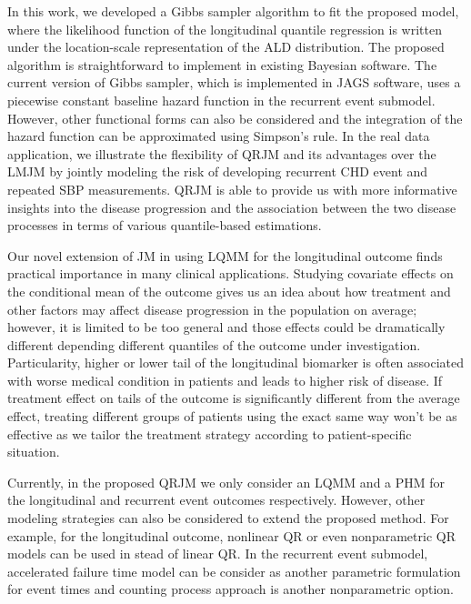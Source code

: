 In this work, we developed a Gibbs sampler algorithm to fit the proposed model, where the likelihood function of the longitudinal quantile regression is written under the location-scale representation of the ALD distribution. The proposed algorithm is straightforward to implement in existing Bayesian software. The current version of Gibbs sampler, which is implemented in \textsf{JAGS} software, uses a piecewise constant baseline hazard function in the recurrent event submodel. However, other functional forms can also be considered and the integration of the hazard function can be approximated using Simpson's rule. In the real data application, we illustrate the flexibility of QRJM and its advantages over the LMJM by jointly modeling the risk of developing recurrent CHD event and repeated SBP measurements. QRJM is able to provide us with more informative insights into the disease progression and the association between the two disease processes in terms of various quantile-based estimations.

Our novel extension of JM in using LQMM for the longitudinal outcome finds practical importance in many clinical applications. Studying covariate effects on the conditional mean of the outcome gives us an idea about how treatment and other factors may affect disease progression in the population on average; however, it is limited to be too general and those effects could be dramatically different depending different quantiles of the outcome under investigation. Particularity, higher or lower tail of the longitudinal biomarker is often associated with worse medical condition in patients and leads to higher risk of disease. If treatment effect on tails of the outcome is significantly different from the average effect, treating different groups of patients using the exact same way won't be as effective as we tailor the treatment strategy according to patient-specific situation.


Currently, in the proposed QRJM we only consider an LQMM and a PHM for the longitudinal and recurrent event outcomes respectively. However, other modeling strategies can also be considered to extend the proposed method. For example, for the longitudinal outcome, nonlinear QR \citep{koenker1996interior} or even nonparametric QR \citep{le2005nonparametric} models can be used in stead of linear QR. In the recurrent event submodel, accelerated failure time model can be consider as another parametric formulation for event times and counting process approach is another nonparametric option.


%
%
% 


% 
